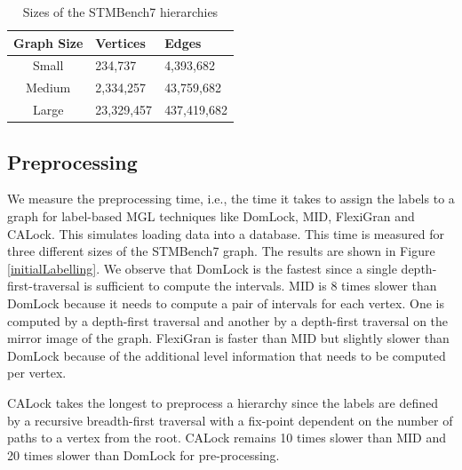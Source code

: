 \begin{table}[h]
	\centering
	\captionsetup{justification=centering}
	\begin{tabular}{c|ll}
		\textbf{Graph Size} & \textbf{Vertices} & \textbf{Edges} \\ \hline
		Small  & 234,737 	& 4,393,682 	\\
		Medium & 2,334,257 	& 43,759,682	\\
		Large  & 23,329,457 & 437,419,682 	\\
	\end{tabular}
	\caption{Sizes of the STMBench7 hierarchies}
	\label{tab:graphSizes}
\end{table}



\subsection{Preprocessing}
We measure the preprocessing time, i.e., the time it takes to assign the labels to a graph for label-based MGL techniques like DomLock, MID, FlexiGran and CALock.
This simulates loading data into a database.
This time is measured for three different sizes of the STMBench7 graph. 
The results are shown in Figure \ref{initialLabelling}. 
We observe that DomLock is the fastest since a single depth-first-traversal is sufficient to compute the intervals. MID is 8 times slower than DomLock because it needs to compute a pair of intervals for each vertex. One is computed by a depth-first traversal and another by a depth-first traversal on the mirror image of the graph. FlexiGran is faster than MID but slightly slower than DomLock because of the additional level information that needs to be computed per vertex. 

CALock takes the longest to preprocess a hierarchy since the labels are defined by a recursive breadth-first traversal with a fix-point dependent on the number of paths to a vertex from the root. CALock remains 10 times slower than MID and 20 times slower than DomLock for pre-processing. 

